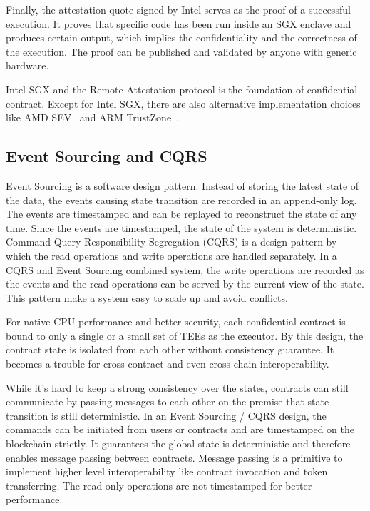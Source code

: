 Finally, the attestation quote signed by Intel serves as the proof of a successful execution. It proves that specific code has been run inside an SGX enclave and produces certain output, which implies the confidentiality and the correctness of the execution. The proof can be published and validated by anyone with generic hardware.

Intel SGX and the Remote Attestation protocol is the foundation of confidential contract. Except for Intel SGX, there are also alternative implementation choices like AMD SEV~\cite{amdsev} and ARM TrustZone~\cite{armtrustzone}.

\subsection{Event Sourcing and CQRS}

Event Sourcing is a software design pattern. Instead of storing the latest state of the data, the events causing state transition are recorded in an append-only log. The events are timestamped and can be replayed to reconstruct the state of any time. Since the events are timestamped, the state of the system is deterministic. Command Query Responsibility Segregation (CQRS) is a design pattern by which the read operations and write operations are handled separately. In a CQRS and Event Sourcing combined system, the write operations are recorded as the events and the read operations can be served by the current view of the state. This pattern make a system easy to scale up and avoid conflicts.

For native CPU performance and better security, each confidential contract is bound to only a single or a small set of TEEs as the executor. By this design, the contract state is isolated from each other without consistency guarantee. It becomes a trouble for cross-contract and even cross-chain interoperability.

While it's hard to keep a strong consistency over the states, contracts can still communicate by passing messages to each other on the premise that state transition is still deterministic. In an Event Sourcing / CQRS design, the commands can be initiated from users or contracts and are timestamped on the blockchain strictly. It guarantees the global state is deterministic and therefore enables message passing between contracts. Message passing is a primitive to implement higher level interoperability like contract invocation and token transferring. The read-only operations are not timestamped for better performance.
